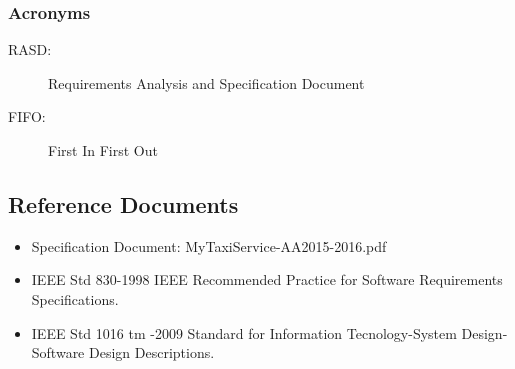 \documentclass[11pt]{article} %
\begin{document}
      \subsubsection{Acronyms}
      \begin{description}
        \item [RASD:] Requirements Analysis and Specification Document
        \item [FIFO:] First In First Out
       \end{description}

    \subsection{Reference Documents}
       \begin{itemize}
       	\item Specification Document: MyTaxiService-AA2015-2016.pdf
        	\item IEEE Std 830-1998 IEEE Recommended Practice for Software Requirements Specifications.
        	\item IEEE Std 1016 tm -2009 Standard for Information Tecnology-System Design-Software Design Descriptions.
       \end{itemize}
\end{document}
